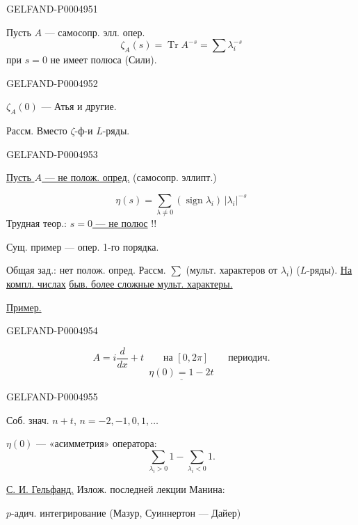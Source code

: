 \begin{GelfandAdjacentEvidence}{GELFAND-P000495}{1}

  

Пусть $A$ — самосопр. элл. опер.
\[
\zeta_A(s)=\operatorname{Tr}A^{-s}=\sum\lambda_i^{-s}
\]
при $s=0$ не имеет полюса (Сили).
\end{GelfandAdjacentEvidence}
\begin{GelfandAdjacentEvidence}{GELFAND-P000495}{2}


$\zeta_A(0)$ — Атья и другие.

Рассм. Вместо $\zeta$-ф-и $L$-ряды.
\end{GelfandAdjacentEvidence}
\begin{GelfandAdjacentEvidence}{GELFAND-P000495}{3}


\begin{flushright}\small \uline{Пусть \mbox{$A$} — не полож. опред.} (самосопр. эллипт.)\end{flushright}
\[
\eta(s)=\sum_{\lambda\ne0}(\operatorname{sign}\lambda_i)\,|\lambda_i|^{-s}
\]
Трудная теор.: \uline{\mbox{$s=0$} — не полюс} !!

Сущ. пример — опер. 1-го порядка.

Общая зад.: нет полож. опред. Рассм.
$\sum$ (мульт. характеров от $\lambda_i$)
($L$-ряды).
\uline{На компл. числах} \uline{быв. более сложные мульт. характеры.}

\uline{Пример.}
\end{GelfandAdjacentEvidence}
\begin{GelfandAdjacentEvidence}{GELFAND-P000495}{4}

\[
 A=i\frac{d}{dx}+t\qquad\text{на }[0,2\pi]\qquad\text{периодич.}
\]
\[
\underline{\eta(0)=1-2t}
\]
\end{GelfandAdjacentEvidence}
\begin{GelfandAdjacentEvidence}{GELFAND-P000495}{5}


Соб. знач. $n+t$, $n=-2,-1,0,1,\ldots$

$\eta(0)$ — «асимметрия» оператора:
\[
\sum_{\lambda_i>0}1-\sum_{\lambda_i<0}1.
\]

\uline{С. И. Гельфанд.} Излож. последней лекции Манина:

$p$-адич. интегрирование (Мазур, Суиннертон — Дайер)
\end{GelfandAdjacentEvidence}



